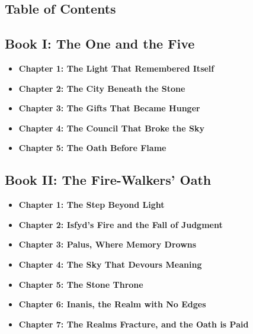 \documentclass[12pt]{article}
\begin{document}
\begin{titlepage}
\section*{Table of Contents}

\vspace{.33in}

\subsection*{Book I: The One and the Five}
\begin{itemize}
  \item \textbf{Chapter 1: The Light That Remembered Itself}
  \item \textbf{Chapter 2: The City Beneath the Stone}
  \item \textbf{Chapter 3: The Gifts That Became Hunger}
  \item \textbf{Chapter 4: The Council That Broke the Sky}
  \item \textbf{Chapter 5: The Oath Before Flame}
\end{itemize}

\vspace{.33in}

\subsection*{Book II: The Fire-Walkers’ Oath}
\begin{itemize}
  \item \textbf{Chapter 1: The Step Beyond Light}
  \item \textbf{Chapter 2: Isfyd’s Fire and the Fall of Judgment}
  \item \textbf{Chapter 3: Palus, Where Memory Drowns}
  \item \textbf{Chapter 4: The Sky That Devours Meaning}
  \item \textbf{Chapter 5: The Stone Throne}
  \item \textbf{Chapter 6: Inanis, the Realm with No Edges}
  \item \textbf{Chapter 7: The Realms Fracture, and the Oath is Paid}
\end{itemize}

\vspace{.33in}


\end{titlepage}
\end{document}
